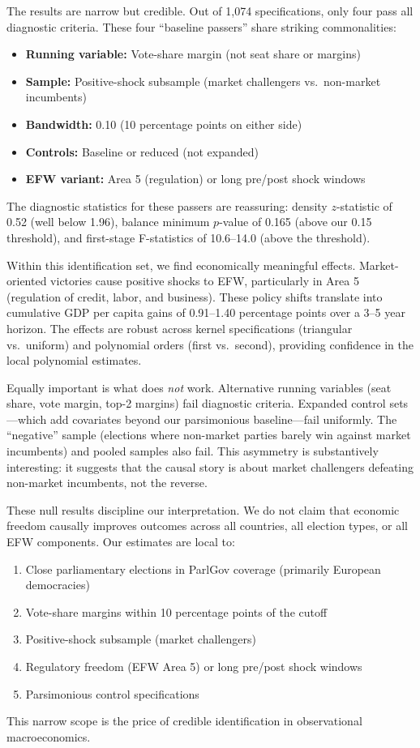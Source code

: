 \documentclass[12pt,a4paper]{article}
\begin{document}
The results are narrow but credible. Out of 1,074 specifications, only four 
pass all diagnostic criteria. These four ``baseline passers'' share 
striking commonalities:
%
\begin{itemize}[noitemsep]
    \item \textbf{Running variable:} Vote-share margin (not seat share or margins)
    \item \textbf{Sample:} Positive-shock subsample (market challengers vs.\ 
    non-market incumbents)
    \item \textbf{Bandwidth:} 0.10 (10 percentage points on either side)
    \item \textbf{Controls:} Baseline or reduced (not expanded)
    \item \textbf{EFW variant:} Area 5 (regulation) or long pre/post shock windows
\end{itemize}
%
The diagnostic statistics for these passers are reassuring: density 
$z$-statistic of 0.52 (well below 1.96), balance minimum $p$-value of 
0.165 (above our 0.15 threshold), and first-stage F-statistics of 10.6--14.0 
(above the \citealt{stock2005testing} threshold).

Within this identification set, we find economically meaningful effects. 
Market-oriented victories cause positive shocks to EFW, particularly in 
Area 5 (regulation of credit, labor, and business). These policy shifts 
translate into cumulative GDP per capita gains of 0.91--1.40 percentage 
points over a 3--5 year horizon. The effects are robust across kernel 
specifications (triangular vs.\ uniform) and polynomial orders (first vs.\ 
second), providing confidence in the local polynomial estimates.

Equally important is what does \textit{not} work. Alternative running 
variables (seat share, vote margin, top-2 margins) fail diagnostic criteria. 
Expanded control sets---which add covariates beyond our parsimonious 
baseline---fail uniformly. The ``negative'' sample (elections where 
non-market parties barely win against market incumbents) and pooled 
samples also fail. This asymmetry is substantively interesting: it suggests 
that the causal story is about market challengers defeating non-market 
incumbents, not the reverse.

These null results discipline our interpretation. We do not claim that 
economic freedom causally improves outcomes across all countries, all 
election types, or all EFW components. Our estimates are local to:
%
\begin{enumerate}[noitemsep]
    \item Close parliamentary elections in ParlGov coverage (primarily 
    European democracies)
    \item Vote-share margins within 10 percentage points of the cutoff
    \item Positive-shock subsample (market challengers)
    \item Regulatory freedom (EFW Area 5) or long pre/post shock windows
    \item Parsimonious control specifications
\end{enumerate}
%
This narrow scope is the price of credible identification in observational 
macroeconomics.
\end{document}
